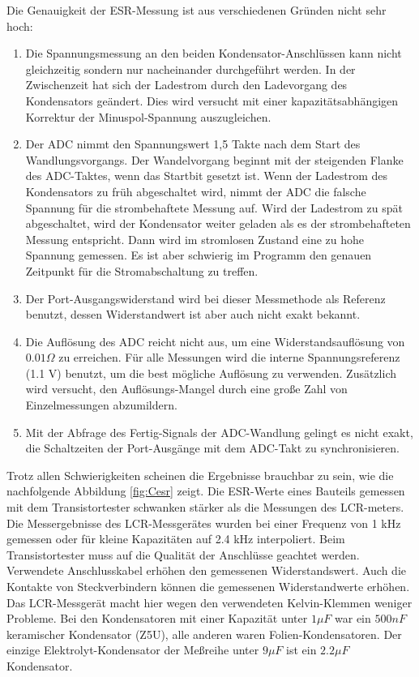 Die Genauigkeit der ESR-Messung ist aus verschiedenen Gründen nicht sehr hoch:
\begin{enumerate}
\item Die Spannungsmessung an den beiden Kondensator-Anschlüssen kann nicht gleichzeitig sondern nur nacheinander durchgeführt werden.
 In der Zwischenzeit hat sich der Ladestrom durch den Ladevorgang des Kondensators geändert.
Dies wird versucht mit einer kapazitätsabhängigen Korrektur der Minuspol-Spannung auszugleichen.
\item Der ADC nimmt den Spannungswert 1,5 Takte nach dem Start des Wandlungsvorgangs. Der Wandelvorgang beginnt mit
der steigenden Flanke des ADC-Taktes, wenn das Startbit gesetzt ist. Wenn der Ladestrom des Kondensators zu früh abgeschaltet wird,
nimmt der ADC die falsche Spannung für die strombehaftete Messung auf. Wird der Ladestrom zu spät abgeschaltet, wird
der Kondensator weiter geladen als es der strombehafteten Messung entspricht.
Dann wird im stromlosen Zustand eine zu hohe Spannung gemessen.
Es ist aber schwierig im Programm den genauen Zeitpunkt für die Stromabschaltung zu treffen.
\item Der Port-Ausgangswiderstand wird bei dieser Messmethode als Referenz benutzt, dessen Widerstandwert
ist aber auch nicht exakt bekannt.
\item Die Auflösung des ADC reicht nicht aus, um eine Widerstandsauflösung von \(0.01 \Omega\) zu erreichen.
Für alle Messungen wird die interne Spannungsreferenz (1.1 V) benutzt, um die best mögliche Auflösung zu verwenden.
Zusätzlich wird versucht, den Auflösungs-Mangel durch eine große Zahl von Einzelmessungen abzumildern.
\item Mit der Abfrage des Fertig-Signals der ADC-Wandlung gelingt es nicht exakt, die Schaltzeiten der Port-Ausgänge mit dem
ADC-Takt zu synchronisieren.
\end{enumerate}

Trotz allen Schwierigkeiten scheinen die Ergebnisse brauchbar zu sein, wie die nachfolgende Abbildung \ref{fig:Cesr} zeigt.
Die ESR-Werte eines Bauteils gemessen mit dem Transistortester schwanken stärker als die Messungen des LCR-meters.
Die Messergebnisse des LCR-Messgerätes wurden bei einer Frequenz von 1 kHz gemessen oder für kleine Kapazitäten auf
2.4 kHz interpoliert.
Beim Transistortester muss auf die Qualität der Anschlüsse geachtet werden. Verwendete Anschlusskabel
erhöhen den gemessenen Widerstandswert. Auch die Kontakte von Steckverbindern können die gemessenen
Widerstandwerte erhöhen. Das LCR-Messgerät macht hier wegen den verwendeten Kelvin-Klemmen weniger Probleme.
Bei den Kondensatoren mit einer Kapazität unter \(1 \mu F\) war ein \(500 nF\) keramischer 
Kondensator (Z5U), alle anderen waren Folien-Kondensatoren. Der einzige Elektrolyt-Kondensator der Meßreihe unter \(9 \mu F\)  
ist ein \(2.2 \mu F\) Kondensator.

